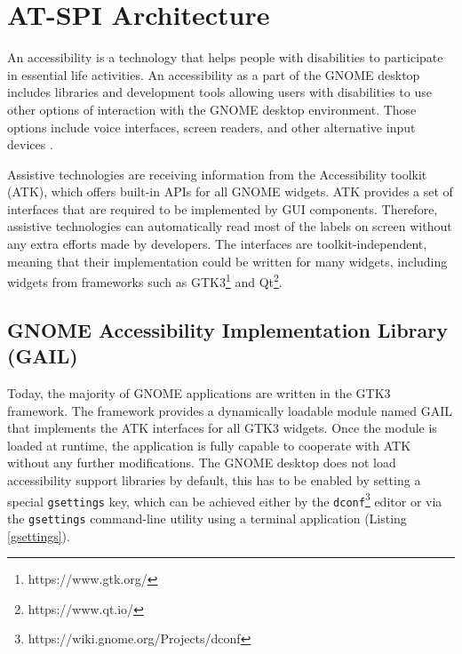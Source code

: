 
\chapter{AT-SPI Architecture}\label{chapter_2}
An accessibility is a technology that helps people with disabilities to participate in essential life activities. An accessibility as a part of the GNOME desktop includes libraries and development tools allowing users with disabilities to use other options of interaction with the GNOME desktop environment. Those options include voice interfaces, screen readers, and other alternative input devices \cite{gnomeADG}.

Assistive technologies are receiving information from the Accessibility toolkit (ATK), which offers built-in APIs for all GNOME widgets. ATK provides a set of interfaces that are required to be implemented by GUI components. Therefore, assistive technologies can automatically read most of the labels on screen without any extra efforts made by developers. The interfaces are toolkit-independent, meaning that their implementation could be written for many widgets, including widgets from frameworks such as GTK3\footnote{https://www.gtk.org/} and Qt\footnote{https://www.qt.io/}.

\section{GNOME Accessibility Implementation Library (GAIL)}
Today, the majority of GNOME applications are written in the GTK3 framework. The framework provides a dynamically loadable module named GAIL that implements the ATK interfaces for all GTK3 widgets. Once the module is loaded at runtime, the application is fully capable to cooperate with ATK without any further modifications.
The GNOME desktop does not load accessibility support libraries by default, this has to be enabled by setting a special \texttt{gsettings} key, which can be achieved either by the \texttt{dconf}\footnote{https://wiki.gnome.org/Projects/dconf} editor or via the \texttt{gsettings} command-line utility using a terminal application (Listing \ref{gsettings}).

